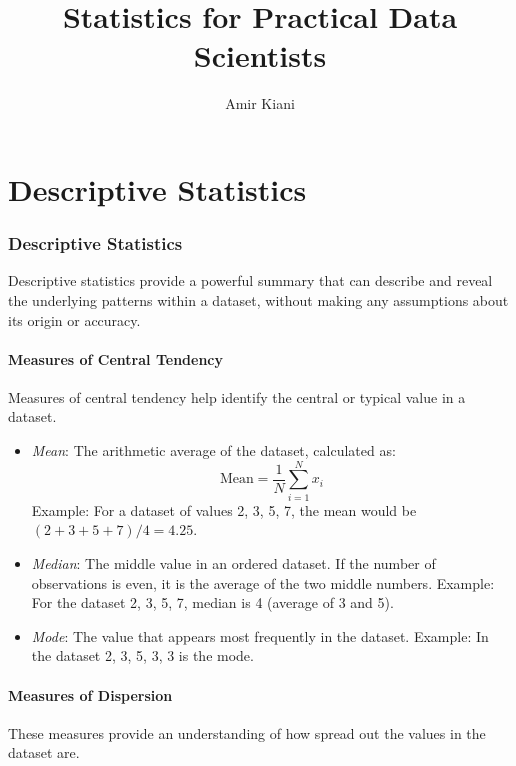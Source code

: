 \documentclass{article}
\title{Statistics for Practical Data Scientists}
\author{Amir Kiani}
\theoremstyle{definition}
\theoremstyle{theorem}
\theoremstyle{theorem}
\theoremstyle{theorem}
\theoremstyle{theorem}
\theoremstyle{definition}
\theoremstyle{definition}
\theoremstyle{definition}
\theoremstyle{definition}
\theoremstyle{definition}
\begin{document}
\maketitle

\tableofcontents
\newpage

\part{Descriptive Statistics}

\section{Descriptive Statistics}

Descriptive statistics provide a powerful summary that can describe and reveal the underlying patterns within a dataset, without making any assumptions about its origin or accuracy.

\subsection{Measures of Central Tendency}

Measures of central tendency help identify the central or typical value in a dataset.

\begin{itemize}
    \item \textit{Mean}: The arithmetic average of the dataset, calculated as:
    \[
    \text{Mean} = \frac{1}{N} \sum_{i=1}^{N} x_i
    \]
    Example: For a dataset of values 2, 3, 5, 7, the mean would be \((2+3+5+7)/4 = 4.25\).

    \item \textit{Median}: The middle value in an ordered dataset. If the number of observations is even, it is the average of the two middle numbers.
    Example: For the dataset 2, 3, 5, 7, median is 4 (average of 3 and 5).

    \item \textit{Mode}: The value that appears most frequently in the dataset.
    Example: In the dataset 2, 3, 5, 3, 3 is the mode.
\end{itemize}

\subsection{Measures of Dispersion}

These measures provide an understanding of how spread out the values in the dataset are.
\end{document}
